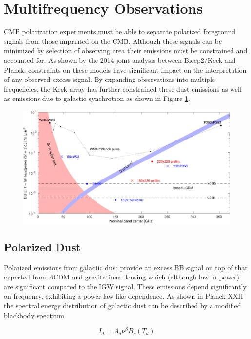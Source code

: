 \documentclass[12pt]{article}
\begin{document}
\section{Multifrequency Observations}

CMB polarization experiments must be able to separate polarized foreground
signals from those imprinted on the CMB. Although these signals can be
minimized by selection of observing area their emissions must be constrained
and accounted for. As shown by the 2014 joint analysis between Bicep2/Keck and
Planck, constraints on these models have significant impact on the
interpretation of any observed excess signal. By expanding observations into
multiple frequencies, the Keck array has further constrained these dust
emissions as well as emissions due to galactic synchrotron as shown in Figure
\ref{fig:noilev}.
\begin{figure}
	\includegraphics[width=\textwidth]{noilev.pdf}
	\caption{}
	\label{fig:noilev}
\end{figure}

\subsection{Polarized Dust}
Polarized emissions from galactic dust provide an excess BB signal on top of
that expected from $\Lambda$CDM and gravitational lensing which (although low
in power) are significant compared to the IGW signal. These emissions depend
significantly on frequency, exhibiting a power law like dependence. As shown
in Planck XXII \cite{cite:PlanckXXII} the spectral energy distribution of
galactic dust can be described by a modified blackbody spectrum

\begin{equation}
	I_d=A_d\nu ^\beta B_{\nu}(T_d)
	\label{eq:dust_sed}
\end{equation}
\end{document}
